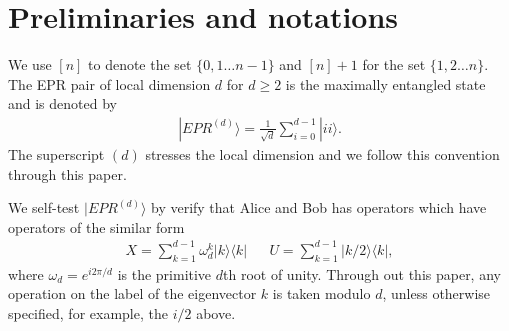 \documentclass[11pt,letterpaper]{article}
\newcommand{\ket}[1]{|#1\rangle}
\newcommand{\ketbra}[2]{|#1\rangle\langle#2|}
\newcommand{\1}{\mathbb{1}}
\newcommand{\EPR}[1]{EPR^{(#1)}}
\theoremstyle{definition}
\begin{document}
\section{Preliminaries and notations}
\label{sec:prelim}
We use $[n]$ to denote the set $\{0,1 \dots n-1\}$ and $[n]+1$ for the set $\{1,2 \dots n\}$.
The EPR pair of local dimension $d$ for $d \geq 2$ is the maximally entangled state and is denoted by
\begin{align}
\ket{\EPR{d}} = \frac{1}{\sqrt{d}} \sum_{i = 0}^{d-1} \ket{ii}.
\end{align}
The superscript $(d)$ stresses the local dimension and we follow this convention through this paper.

We self-test $\ket{\EPR{d}}$ by verify that Alice and Bob has operators 
which have operators of the similar form
\begin{align}
	X = \sum_{k=1}^{d-1} \omega_d^k\ketbra{k}{k} && U = \sum_{k=1}^{d-1} \ketbra{k/2}{k},
\end{align}
where $\omega_d = e^{i2\pi/d}$ is the primitive $d$th root of unity.
Through out this paper, any operation on the label of the eigenvector $k$ is taken modulo $d$,
unless otherwise specified, for example, the $i/2$ above.
\end{document}
